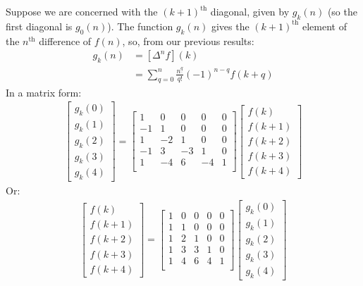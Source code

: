 \documentclass{article}
\renewcommand\({\left(}
\renewcommand\){\right)}
\begin{document}
Suppose we are concerned with the $(k+1)^\text{th}$ diagonal, given by $g_k(n)$ (so the first diagonal is $g_0(n)$). The function $g_k(n)$ gives the $(k+1)^\text{th}$ element of the $n^\text{th}$ difference of $f(n)$, so, from our previous results:
\begin{align*}
    g_k(n)&=[\Delta^nf](k)\\
    &=\sum_{q=0}^n\frac{n^{\underline{q}}}{q!}(-1)^{n-q}f(k+q)
\end{align*}
In a matrix form:
\begin{align*}
    \begin{bmatrix}g_k(0)\\g_k(1)\\g_k(2)\\g_k(3)\\g_k(4)\end{bmatrix}=
    \begin{bmatrix}
 1 & 0 & 0 & 0 & 0 \\
 -1 & 1 & 0 & 0 & 0 \\
 1 & -2 & 1 & 0 & 0 \\
 -1 & 3 & -3 & 1 & 0 \\
 1 & -4 & 6 & -4 & 1 \\
    \end{bmatrix}
    \begin{bmatrix}f(k)\\f(k+1)\\f(k+2)\\f(k+3)\\f(k+4)\end{bmatrix}
\end{align*}
Or:
\begin{align*}
    \begin{bmatrix}f(k)\\f(k+1)\\f(k+2)\\f(k+3)\\f(k+4)\end{bmatrix}=
    \begin{bmatrix}
 1 & 0 & 0 & 0 & 0 \\
 1 & 1 & 0 & 0 & 0 \\
 1 & 2 & 1 & 0 & 0 \\
 1 & 3 & 3 & 1 & 0 \\
 1 & 4 & 6 & 4 & 1 \\
    \end{bmatrix}
    \begin{bmatrix}g_k(0)\\g_k(1)\\g_k(2)\\g_k(3)\\g_k(4)\end{bmatrix}
\end{align*}
\end{document}
